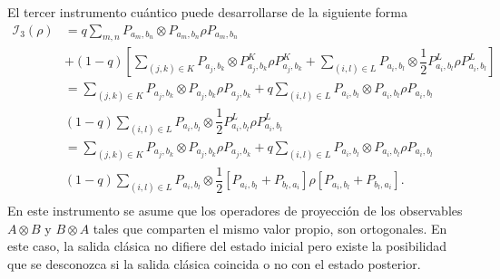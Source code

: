 
El tercer instrumento cuántico puede desarrollarse de la siguiente forma
\begin{equation}\label{eq:quantum-instrument-3-desarrollo}
    \begin{split}
        \mathcal{I}_3(\rho)&=q\sum_{m,n}  P_{a_m,b_n}\otimes P_{a_m,b_n}\rho P_{a_m,b_n}\\
        &+(1-q)\left[\sum_{(j,k)\in K}P_{a_j,b_k} \otimes P^{K}_{a_j,b_k}\rho P^{K}_{a_j,b_k}+\sum_{(i,l) \in L}P_{a_i,b_l} \otimes  \dfrac{1}{2}P^{L}_{a_i,b_l}\rho P^L_{a_i,b_l}\right]\\
        &=\sum_{(j,k)\in K}  P_{a_j,b_k}\otimes P_{a_j,b_k}\rho P_{a_j,b_k}+q\sum_{(i,l)\in L}P_{a_i,b_l} \otimes P_{a_i,b_l}\rho P_{a_i,b_l}\\
        &(1-q)\sum_{(i,l) \in L}P_{a_i,b_l} \otimes  \dfrac{1}{2}P^{L}_{a_i,b_l}\rho P^L_{a_i,b_l}\\
        &=\sum_{(j,k)\in K}  P_{a_j,b_k}\otimes P_{a_j,b_k}\rho P_{a_j,b_k}+q\sum_{(i,l)\in L}P_{a_i,b_l} \otimes P_{a_i,b_l}\rho P_{a_i,b_l}\\
        &(1-q)\sum_{(i,l) \in L}P_{a_i,b_l} \otimes  \dfrac{1}{2}\left[P_{a_i,b_l}+P_{b_l,a_i}\right]\rho \left[P_{a_i,b_l}+P_{b_l,a_i}\right].\\
    \end{split}
\end{equation}En este instrumento se asume que los operadores de proyección de los observables $A\otimes B$ y $B\otimes A$ tales que comparten el mismo valor propio, son ortogonales. En este caso, la salida clásica no difiere del estado inicial pero existe la posibilidad que se desconozca si la salida clásica coincida o no  con el estado posterior. 


